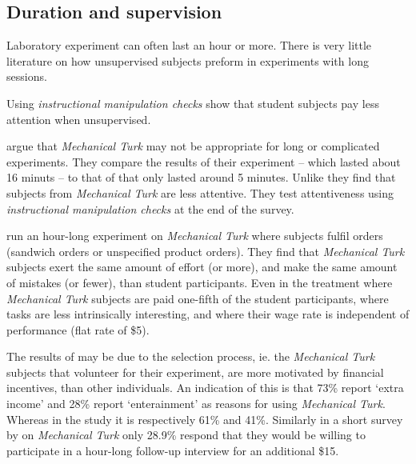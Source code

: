 \documentclass[preprint, 12pt]{elsarticle}
\begin{document}

\subsection{Duration and supervision}

Laboratory experiment can often last an hour or more. There is very little literature on how unsupervised subjects preform in  experiments with long sessions. 

Using \emph{instructional manipulation checks} \citet*{Oppenheimer_Meyvis_Davidenko_2009} show that student subjects pay less attention when unsupervised.

\cite{Goodman_Cryder_Cheema_2013} argue that \emph{Mechanical Turk} may not be appropriate for long or complicated experiments. They compare the results of their experiment -- which lasted about 16 minuts -- to that of \citet*{Paolacci_Chandler_Ipeirotis_2010} that only lasted around 5 minutes. Unlike \cite{Paolacci_Chandler_Ipeirotis_2010} they find that subjects from \emph{Mechanical Turk} are less attentive. They test attentiveness using \emph{instructional manipulation checks} at the end of the survey.

\citet*{Farrell_Grenier_Leiby_2014} run an hour-long experiment on \emph{Mechanical Turk} where subjects fulfil orders (sandwich orders or unspecified product orders). They find that \emph{Mechanical Turk} subjects exert the same amount of effort (or more), and make the same amount of mistakes (or fewer), than student participants. Even in the treatment where \emph{Mechanical Turk} subjects are paid one-fifth of the student participants, where tasks are less intrinsically interesting, and where their wage rate is independent of performance (flat rate of \$5).

The results of \cite{Farrell_Grenier_Leiby_2014} may be due to the selection process, ie. the \emph{Mechanical Turk} subjects that volunteer for their experiment, are more motivated by financial incentives, than other individuals. An indication of this is that 73\% report `extra income' and 28\% report `enterainment' as reasons for using \emph{Mechanical Turk}. Whereas in the \cite{Paolacci_Chandler_Ipeirotis_2010} study it is respectively 61\% and 41\%. Similarly in a short survey by \cite{Williamson_2014} on \emph{Mechanical Turk} only 28.9\% respond that they would be willing to participate in a hour-long follow-up interview for an additional \$15.
\end{document}
